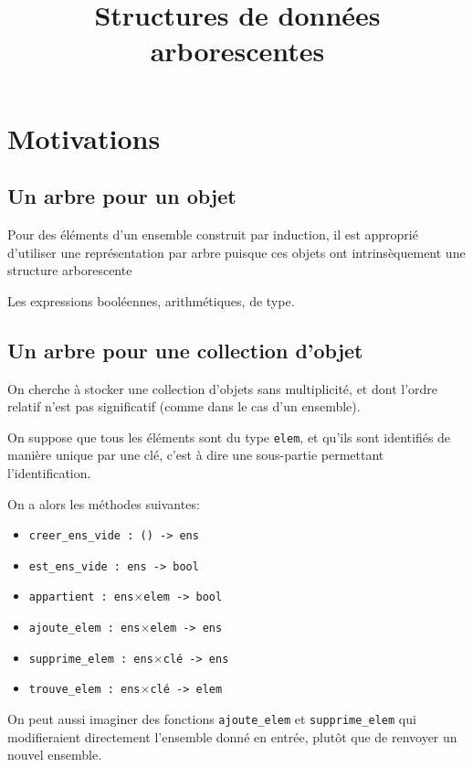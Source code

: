 \documentclass{scrartcl}
\title{Structures de données arborescentes}
\author{}
\date{}
\begin{document}
	\maketitle
	\section{Motivations}
		\subsection{Un arbre pour un objet}
			Pour des éléments d'un ensemble construit par induction, 
			il est approprié d'utiliser une représentation par arbre puisque 
			ces objets ont intrinsèquement une structure arborescente

			\exemple Les expressions booléennes, arithmétiques, de type. 

		\subsection{Un arbre pour une collection d'objet}
			On cherche à stocker une collection d'objets sans multiplicité,
			et dont l'ordre relatif n'est pas significatif 
			(comme dans le cas d'un ensemble).

			On suppose que tous les éléments sont du type \texttt{elem}, 
			et qu'ils sont identifiés de manière unique par une clé, 
			c'est à dire une sous-partie permettant l'identification.
			
			On a alors les méthodes suivantes:
			\begin{multicols}{2}
			\begin{itemize}
				\item \texttt{creer\_ens\_vide : () -> ens}
				\item \texttt{est\_ens\_vide : ens -> bool}
				\item \texttt{appartient : ens$\times$elem -> bool}
				\item \texttt{ajoute\_elem : ens$\times$elem -> ens}
				\item \texttt{supprime\_elem : ens$\times$clé -> ens}
				\item \texttt{trouve\_elem : ens$\times$clé -> elem}
			\end{itemize}
			\end{multicols} 

			\rem On peut aussi imaginer des fonctions \texttt{ajoute\_elem} et \texttt{supprime\_elem}
			qui modifieraient directement l'ensemble donné en entrée, 
			plutôt que de renvoyer un nouvel ensemble. 
\end{document}
